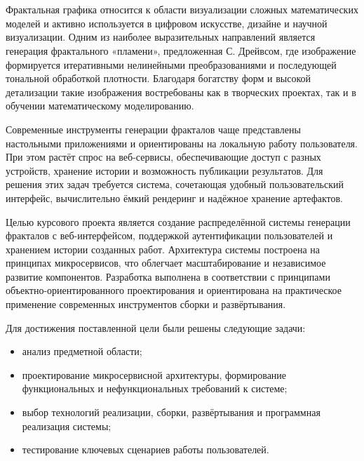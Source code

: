 \newpage

\section*{}

Фрактальная графика относится к области визуализации сложных математических моделей и активно используется в цифровом искусстве, дизайне и научной визуализации. Одним из наиболее выразительных направлений является генерация фрактального «пламени», предложенная С. Дрейвсом, где изображение формируется итеративными нелинейными преобразованиями и последующей тональной обработкой плотности. Благодаря богатству форм и высокой детализации такие изображения востребованы как в творческих проектах, так и в обучении математическому моделированию.

Современные инструменты генерации фракталов чаще представлены настольными приложениями и ориентированы на локальную работу пользователя. При этом растёт спрос на веб-сервисы, обеспечивающие доступ с разных устройств, хранение истории и возможность публикации результатов. Для решения этих задач требуется система, сочетающая удобный пользовательский интерфейс, вычислительно ёмкий рендеринг и надёжное хранение артефактов.

Целью курсового проекта является создание распределённой системы генерации фракталов с веб-интерфейсом, поддержкой аутентификации пользователей и хранением истории созданных работ. Архитектура системы построена на принципах микросервисов, что облегчает масштабирование и независимое развитие компонентов. Разработка выполнена в соответствии с принципами объектно-ориентированного проектирования и ориентирована на практическое применение современных инструментов сборки и развёртывания.

Для достижения поставленной цели были решены следующие задачи:
\begin{itemize}
  \item анализ предметной области;
  \item проектирование микросервисной архитектуры, формирование функциональных и нефункциональных требований к системе;
  \item выбор технологий реализации, сборки, развёртывания и программная реализация системы;
  \item тестирование ключевых сценариев работы пользователей.
\end{itemize}

\newpage

